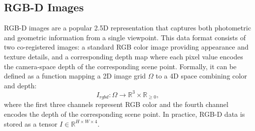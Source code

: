 \begin{table}[!t]
\centering
\caption{Qualitative comparison of 3D representations (relative ratings, not measured values).}
\label{tab:p2_s4_1_3d_comparison}
\end{table}


\subsection{RGB-D Images}
\label{sec:rep_3d_rgbd}

RGB-D images are a popular 2.5D representation that captures both photometric and geometric information from a single viewpoint.
This data format consists of two co-registered images: a standard RGB color image providing appearance and texture details, and a corresponding depth map where each pixel value encodes the camera-space depth of the corresponding scene point.
Formally, it can be defined as a function mapping a 2D image grid $\Omega$ to a 4D space combining color and depth:
\begin{equation}
I_{rgbd}: \Omega \rightarrow \mathbb{R}^3 \times \mathbb{R}_{\geq 0},
\end{equation}
where the first three channels represent RGB color and the fourth channel encodes the depth of the corresponding scene point. In practice, RGB-D data is stored as a tensor $I \in \mathbb{R}^{H \times W \times 4}$.

